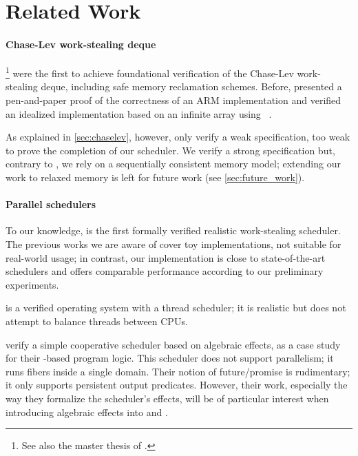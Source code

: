 \section{Related Work}
\label{sec:related_work}

\paragraph{Chase-Lev work-stealing deque}

%
\footnote{
See also the master thesis of \citet{DBLP:journals/corr/abs-2309-03642}.
}
were the first to achieve foundational verification of the Chase-Lev work-stealing deque, including safe memory reclamation schemes.
Before, \citet{DBLP:conf/ppopp/LePCN13} presented a pen-and-paper proof of the correctness of an ARM implementation and \citet{DBLP:journals/computing/MutluergilT19} verified an idealized implementation based on an infinite array using \CIVL~\citep{DBLP:conf/fmcad/KraglQ21}.

As explained in \cref{sec:chaselev}, however, \citet{DBLP:journals/pacmpl/JungLCKPK23} only verify a weak specification, too weak to prove the completion of our scheduler.
We verify a strong specification but, contrary to \citet{DBLP:conf/ppopp/LePCN13}, we rely on a sequentially consistent memory model; extending our work to relaxed memory is left for future work (see \cref{sec:future_work}).

\paragraph{Parallel schedulers}

To our knowledge, \Parabs is the first formally verified realistic work-stealing scheduler.
The previous works we are aware of cover toy implementations, not suitable for real-world usage; in contrast, our implementation is close to state-of-the-art schedulers and offers comparable performance according to our preliminary experiments.

 is a verified operating system with a thread scheduler; it is realistic but does not attempt to balance threads between CPUs.

 verify a simple cooperative scheduler based on algebraic effects, as a case study for their \Iris-based program logic.
This scheduler does not support parallelism; it runs fibers inside a single domain.
Their notion of future/promise is rudimentary; it only supports persistent output predicates.
However, their work, especially the way they formalize the scheduler's effects, will be of particular interest when introducing algebraic effects into \ZooLang and \Parabs.


